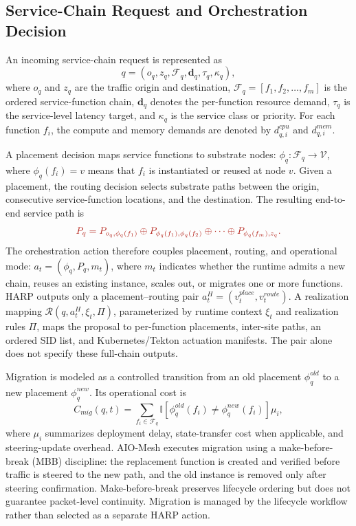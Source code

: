 \documentclass[final,5p]{elsarticle}
\newcommand{\rev}[1]{\textcolor{BrickRed}{#1}}
\begin{document}
\subsection{Service-Chain Request and Orchestration Decision}
\label{subsec:sfc_model}

An incoming service-chain request is represented as
\begin{equation}
q=(o_q,z_q,\mathcal{F}_q,\mathbf{d}_q,\tau_q,\kappa_q),
\end{equation}
where \(o_q\) and \(z_q\) are the traffic origin and destination, \(\mathcal{F}_q=[f_1,f_2,\ldots,f_m]\) is the ordered service-function chain, \(\mathbf{d}_q\) denotes the per-function resource demand, \(\tau_q\) is the service-level latency target, and \(\kappa_q\) is the service class or priority. For each function \(f_i\), the compute and memory demands are denoted by \(d_{q,i}^{cpu}\) and \(d_{q,i}^{mem}\).

A placement decision maps service functions to substrate nodes: $\phi_q:\mathcal{F}_q\rightarrow\mathcal{V}$, where \(\phi_q(f_i)=v\) means that \(f_i\) is instantiated or reused at node \(v\). Given a placement, the routing decision selects substrate paths between the origin, consecutive service-function locations, and the destination. The resulting end-to-end service path is
\begin{equation}
\rev{P_q=P_{o_q,\phi_q(f_1)}\oplus P_{\phi_q(f_1),\phi_q(f_2)}\oplus\cdots\oplus P_{\phi_q(f_m),z_q}.}
\label{eq:full_chain_path}
\end{equation}
The orchestration action therefore couples placement, routing, and operational mode: $a_t=(\phi_q,P_q,m_t)$, where \(m_t\) indicates whether the runtime admits a new chain, reuses an existing instance, scales out, or migrates one or more functions. \rev{HARP outputs only a placement--routing pair \(a_t^H=(v_t^{place},v_t^{route})\). A realization mapping \(\mathcal R(q,a_t^H,\xi_t,\Pi)\), parameterized by runtime context \(\xi_t\) and realization rules \(\Pi\), maps the proposal to per-function placements, inter-site paths, an ordered SID list, and Kubernetes/Tekton actuation manifests. The pair alone does not specify these full-chain outputs.}

Migration is modeled as a controlled transition from an old placement \(\phi_q^{old}\) to a new placement \(\phi_q^{new}\). Its operational cost is
\begin{equation}
C_{mig}(q,t)=\sum_{f_i\in\mathcal{F}_q}\mathbb{I}\!\left[\phi_q^{old}(f_i)\neq\phi_q^{new}(f_i)\right]\mu_i,
\end{equation}
where \(\mu_i\) summarizes deployment delay, state-transfer cost when applicable, and steering-update overhead. AIO-Mesh executes migration using a \rev{make-before-break (MBB)} discipline: the replacement function is created and verified before traffic is steered to the new path, and the old instance is removed only after steering confirmation. \rev{Make-before-break preserves lifecycle ordering but does not guarantee packet-level continuity.} \rev{Migration is managed by the lifecycle workflow rather than selected as a separate HARP action.}
\end{document}
